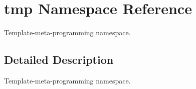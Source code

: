 \hypertarget{namespacetmp}{}\section{tmp Namespace Reference}
\label{namespacetmp}


Template-\/meta-\/programming namespace.  




\subsection{Detailed Description}
Template-\/meta-\/programming namespace. 
